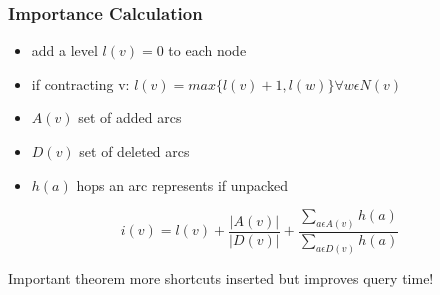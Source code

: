 \begin{frame}
    \frametitle{Importance Calculation}

    \begin{itemize}
        \item add a level $l(v) = 0$ to each node 
        \item if contracting v: $l(v) = max\{l(v)+1, l(w)\} \forall w \epsilon N(v)$
        \item $A(v)$ set of added arcs
        \item $D(v)$ set of deleted arcs
        \item $h(a)$ hops an arc represents if unpacked
    \end{itemize}

    \begin{equation*}
        \label{eq:importance}
        i(v) = l(v) + \frac{|A(v)|}{|D(v)|} + \frac{\sum_{a \epsilon A(v)} h(a)}{\sum_{a \epsilon D(v)} h(a)} 
    \end{equation*}
    
    \begin{alertblock}{Important theorem}
        more shortcuts inserted but improves query time!
    \end{alertblock}
\end{frame}